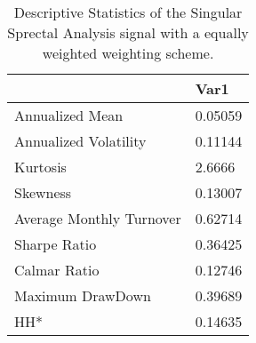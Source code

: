\begin{table}[H]
\centering
\begin{tabular}{ll}
& Var1 \\ 
\hline 
Annualized Mean & 0.05059 \\ 
Annualized Volatility & 0.11144 \\ 
Kurtosis & 2.6666 \\ 
Skewness & 0.13007 \\ 
Average Monthly Turnover & 0.62714 \\ 
Sharpe Ratio & 0.36425 \\ 
Calmar Ratio & 0.12746 \\ 
Maximum DrawDown & 0.39689 \\ 
HH* & 0.14635 \\ 
\hline
\end{tabular}
\caption{Descriptive Statistics of the Singular Sprectal Analysis signal with a equally weighted weighting scheme.}
\label{SSA_EW}
\end{table}